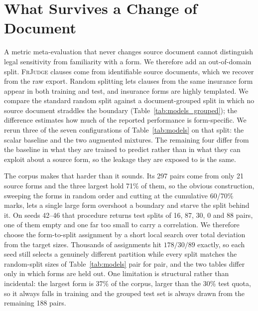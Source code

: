 \documentclass[11pt]{article}
\begin{document}
\begin{table}[t]\centering\small

\caption{Williams tests against the trivial length baseline
$\ell = -|\,|s|-|o|\,|$, which reaches $r=0.613$ with the human label $h$ over
all $297$ items. $r(m,\ell)$ is each metric's correlation with the length
feature itself, the dependence the test corrects for. Positive $t$ favours
$\ell$.}
\label{tab:significance}
\end{table}

\section{What Survives a Change of Document}
\label{app:grouped}

A metric meta-evaluation that never changes source document cannot distinguish
legal sensitivity from familiarity with a form. We therefore add an
out-of-domain split. \textsc{FrJudge} clauses come from identifiable source
documents, which we recover from the raw export. Random splitting lets clauses
from the same insurance form appear in both training and test, and insurance
forms are highly templated. We compare the standard random split against a
document-grouped split in which no source document straddles the boundary
(Table~\ref{tab:models_grouped}); the difference estimates how much of the
reported performance is form-specific. We rerun three of the seven
configurations of Table~\ref{tab:models} on that split: the scalar baseline and
the two augmented mixtures. The remaining four differ from the baseline in what
they are trained to predict rather than in what they can exploit about a source
form, so the leakage they are exposed to is the same.

The corpus makes that harder than it sounds. Its 297 pairs come from only 21
source forms and the three largest hold 71\% of them, so the obvious
construction, sweeping the forms in random order and cutting at the cumulative
60/70\% marks, lets a single large form overshoot a boundary and starve the
split behind it. On seeds 42--46 that procedure returns test splits of 16, 87,
30, 0 and 88 pairs, one of them empty and one far too small to carry a
correlation. We therefore choose the form-to-split assignment by a short local
search over total deviation from the target sizes. Thousands of assignments hit
$178/30/89$ exactly, so each seed still selects a genuinely different partition
while every split matches the random-split sizes of Table~\ref{tab:models} pair
for pair, and the two tables differ only in which forms are held out. One
limitation is structural rather than incidental: the largest form is 37\% of the
corpus, larger than the 30\% test quota, so it always falls in training and the
grouped test set is always drawn from the remaining 188 pairs.
\end{document}

